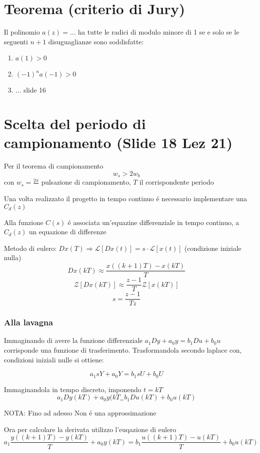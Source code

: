 \documentclass{article}
\begin{document}
\section{Teorema (criterio di Jury)}
Il polinomio $a(z) = \ldots$ ha tutte le radici di modulo minore di 1 se e solo se le seguenti $n+1$ disuguaglianze sono soddisfatte:
\begin{enumerate}
    \item $a(1) > 0$
    \item $(-1)^n a(-1) > 0$
    \item $\ldots$ slide 16
\end{enumerate}

\section{Scelta del periodo di campionamento (Slide 18 Lez 21)}

Per il teorema di campionamento
\[ w_s > 2w_b \]
con $w_s = \frac{2\pi}{}$ pulsazione di campionamento, $T$ il corrispondente periodo

Una volta realizzato il progetto in tempo continuo \'e necessario implementare una $C_d(z)$

Alla funzione $C(s)$ \'e associata un'equazine differenziale in tempo continuo, a $C_d(z)$  un equazione di differenze

Metodo di eulero: $Dx(T) \Rightarrow \mathcal{L}[Dx(t)] = s\cdot\mathcal{L}[x(t)]$ (condizione iniziale nulla)
\[ Dx(kT) \approx \frac{x((k+1)T) - x(kT)}{T}\]
\[ \mathcal{Z}[Dx(kT)]  \approx \frac{z-1}{T}\mathcal{Z}[x(kT)]\]
\[ s = \frac{z-1}{Tz}\]

\subsubsection{Alla lavagna}

Immaginando di avere la funzione differenziale $a_1 Dy + a_0y = b_1Du + b_0u$ corrisponde una funzione di trasferimento.
Trasformandola secondo laplace con, condizioni iniziali nulle si ottiene:

\[ a_1 sY + a_0 Y = b_1 sU + b_0 U \]

Immaginandola in tempo discreto, imponendo $t = kT$
\[ a_1 Dy(kT) + a_0 y(kT_ = b_1 Du(kT) + b_0u(kT) \]

NOTA: Fino ad adesso Non \'e una approssimazione

Ora per calcolare la derivata utilizzo l'euqazione di eulero
\[ a_1 \frac{y((k+1)T) - y(kT)}{T} + a_0 y(kT) = b_1\frac{u((k+1)T) - u(kT)}{T} + b_0u(kT)\]
\end{document}
